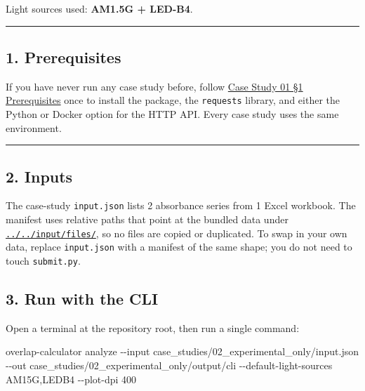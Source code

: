 \documentclass[
  11pt,
]{article}
\newenvironment{Shaded}{}{}
\newcommand{\AttributeTok}[1]{\textcolor[rgb]{0.49,0.56,0.16}{#1}}
\newcommand{\ExtensionTok}[1]{#1}
\newcommand{\NormalTok}[1]{#1}
\begin{document}
Light sources used: \textbf{AM1.5G + LED-B4}.

\begin{center}\rule{0.5\linewidth}{0.5pt}\end{center}

\hypertarget{1-prerequisites}{
\subsection{1. Prerequisites}\label{1-prerequisites}}

If you have never run any case study before, follow
\href{https://github.com/pinarsyt/overlap-calculator/blob/main/case_studies/01_theoretical_only/README.md\#1-prerequisites}{Case
Study 01 §1 Prerequisites} once to install the package, the
\texttt{requests} library, and either the Python or Docker option for
the HTTP API. Every case study uses the same environment.

\begin{center}\rule{0.5\linewidth}{0.5pt}\end{center}

\hypertarget{2-inputs}{
\subsection{2. Inputs}\label{2-inputs}}

The case-study \texttt{input.json} lists 2 absorbance series from 1
Excel workbook. The manifest uses relative paths that point at the
bundled data under
\href{https://github.com/pinarsyt/overlap-calculator/blob/main/input/files}{\texttt{../../input/files/}},
so no files are copied or duplicated. To swap in your own data, replace
\texttt{input.json} with a manifest of the same shape; you do not need
to touch \texttt{submit.py}.

\hypertarget{3-run-with-the-cli}{
\subsection{3. Run with the CLI}\label{3-run-with-the-cli}}

Open a terminal at the repository root, then run a single command:

\begin{Shaded}
\begin{Highlighting}[]
\ExtensionTok{overlap{-}calculator}\NormalTok{ analyze }\AttributeTok{{-}{-}input}\NormalTok{ case\_studies/02\_experimental\_only/input.json }\AttributeTok{{-}{-}out}\NormalTok{ case\_studies/02\_experimental\_only/output/cli }\AttributeTok{{-}{-}default{-}light{-}sources}\NormalTok{ AM15G,LEDB4 }\AttributeTok{{-}{-}plot{-}dpi}\NormalTok{ 400}
\end{Highlighting}
\end{Shaded}
\end{document}
